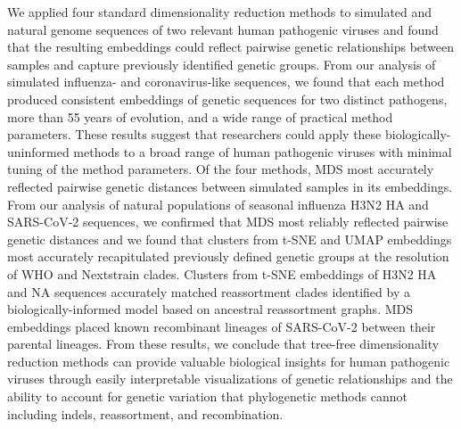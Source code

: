 \documentclass[10pt,letterpaper]{article}
\begin{document}
We applied four standard dimensionality reduction methods to simulated and natural genome sequences of two relevant human pathogenic viruses and found that the resulting embeddings could reflect pairwise genetic relationships between samples and capture previously identified genetic groups.
From our analysis of simulated influenza- and coronavirus-like sequences, we found that each method produced consistent embeddings of genetic sequences for two distinct pathogens, more than 55 years of evolution, and a wide range of practical method parameters.
These results suggest that researchers could apply these biologically-uninformed methods to a broad range of human pathogenic viruses with minimal tuning of the method parameters.
Of the four methods, MDS most accurately reflected pairwise genetic distances between simulated samples in its embeddings.
From our analysis of natural populations of seasonal influenza H3N2 HA and SARS-CoV-2 sequences, we confirmed that MDS most reliably reflected pairwise genetic distances and we found that clusters from t-SNE and UMAP embeddings most accurately recapitulated previously defined genetic groups at the resolution of WHO and Nextstrain clades.
Clusters from t-SNE embeddings of H3N2 HA and NA sequences accurately matched reassortment clades identified by a biologically-informed model based on ancestral reassortment graphs.
MDS embeddings placed known recombinant lineages of SARS-CoV-2 between their parental lineages.
From these results, we conclude that tree-free dimensionality reduction methods can provide valuable biological insights for human pathogenic viruses through easily interpretable visualizations of genetic relationships and the ability to account for genetic variation that phylogenetic methods cannot including indels, reassortment, and recombination.
\end{document}
